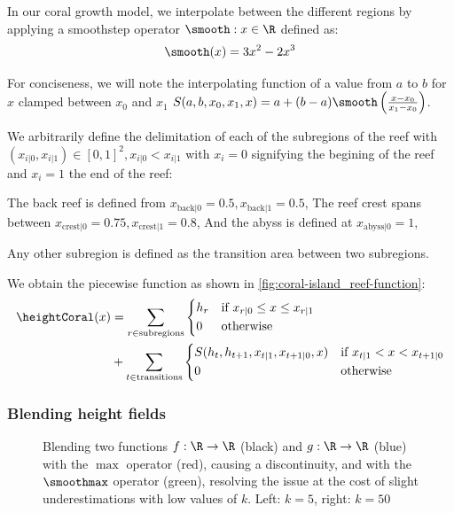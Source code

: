 In our coral growth model, we interpolate between the different regions by applying a smoothstep operator $\smooth: x \in \R$ defined as:
\begin{align}
    \smooth(x) = 3x^2 - 2x^3
\end{align}

For conciseness, we will note the interpolating function of a value from $a$ to $b$ for $x$ clamped between $x_0$ and $x_1$ $S(a, b, x_0, x_1, x) = a + (b-a) \smooth\left(\frac{x - x_0}{x_1 - x_0}\right)$.

We arbitrarily define the delimitation of each of the subregions of the reef with $(x_{i|0}, x_{i|1}) \in [0, 1]^2, x_{i|0} < x_{i|1}$ with $x_i = 0$ signifying the begining of the reef and $x_i = 1$ the end of the reef:
\begin{Itemize}
    \Item{} The back reef is defined from $x_{\text{back}|0} = 0.5, x_{\text{back}|1} = 0.5$,
    \Item{} The reef crest spans between $x_{\text{crest}|0} = 0.75, x_{\text{crest}|1} = 0.8$,
    \Item{} And the abyss is defined at $x_{\text{abyss}|0} = 1$,
\end{Itemize}
Any other subregion is defined as the transition area between two subregions.

We obtain the piecewise function as shown in \cref{fig:coral-island_reef-function}:
\begin{align}
    \heightCoral(x) &= \sum_{r \in \text{subregions}}{
    \begin{dcases}
        h_r & \text{if } x_{r|0} \leq x \leq x_{r|1} \\
        0 & \text{otherwise}
    \end{dcases}
    } \nonumber \\ 
    &+
    \sum_{t \in \text{transitions}} {
        \begin{dcases}
            S(h_{t}, h_{t+1}, x_{t|1}, x_{t+1|0}, x) & \text{if } x_{t|1} < x < x_{t+1|0} \\
            0 & \text{otherwise}
        \end{dcases}
    }
\end{align}

\subsubsection{Blending height fields}
\label{subsubsec:height-functions-blending}

\begin{figure}[H]
    \caption{Blending two functions $f: \R \to \R$ (black) and $g: \R \to \R$ (blue) with the $\max$ operator (red), causing a discontinuity, and with the $\smoothmax$ operator (green), resolving the issue at the cost of slight underestimations with low values of $k$. Left: $k=5$, right: $k=50$}
    \label{fig:coral-island_blend-function-island}
\end{figure}

